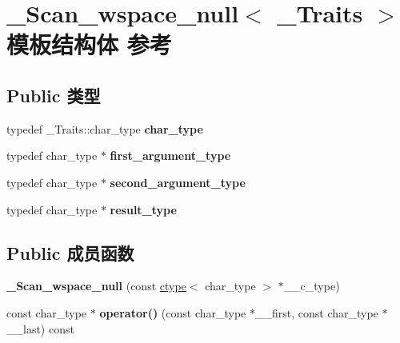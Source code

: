 \hypertarget{struct___scan__wspace__null}{}\section{\+\_\+\+Scan\+\_\+wspace\+\_\+null$<$ \+\_\+\+Traits $>$ 模板结构体 参考}
\label{struct___scan__wspace__null}
\subsection*{Public 类型}
\begin{DoxyCompactItemize}
\item 
\mbox{\label{struct___scan__wspace__null_aab73a0ce9c04ce3bf0f9d9121df1e7b0}} 
typedef \+\_\+\+Traits\+::char\+\_\+type {\bfseries char\+\_\+type}
\item 
\mbox{\label{struct___scan__wspace__null_ac190f187081de8b8ea63c2597f6679bb}} 
typedef char\+\_\+type $\ast$ {\bfseries first\+\_\+argument\+\_\+type}
\item 
\mbox{\label{struct___scan__wspace__null_a1f95991d1cd44e98e4e670293254bc4f}} 
typedef char\+\_\+type $\ast$ {\bfseries second\+\_\+argument\+\_\+type}
\item 
\mbox{\label{struct___scan__wspace__null_a2ee93383f269f053aea9e71ff9983380}} 
typedef char\+\_\+type $\ast$ {\bfseries result\+\_\+type}
\end{DoxyCompactItemize}
\subsection*{Public 成员函数}
\begin{DoxyCompactItemize}
\item 
\mbox{\label{struct___scan__wspace__null_a693a809ce2addbfd9b063d903a87f3a4}} 
{\bfseries \+\_\+\+Scan\+\_\+wspace\+\_\+null} (const \hyperlink{classctype}{ctype}$<$ char\+\_\+type $>$ $\ast$\+\_\+\+\_\+c\+\_\+type)
\item 
\mbox{\label{struct___scan__wspace__null_a1b5fc7fa4684ca2b4c18dbaba16c2c0d}} 
const char\+\_\+type $\ast$ {\bfseries operator()} (const char\+\_\+type $\ast$\+\_\+\+\_\+first, const char\+\_\+type $\ast$\+\_\+\+\_\+last) const
\end{DoxyCompactItemize}
